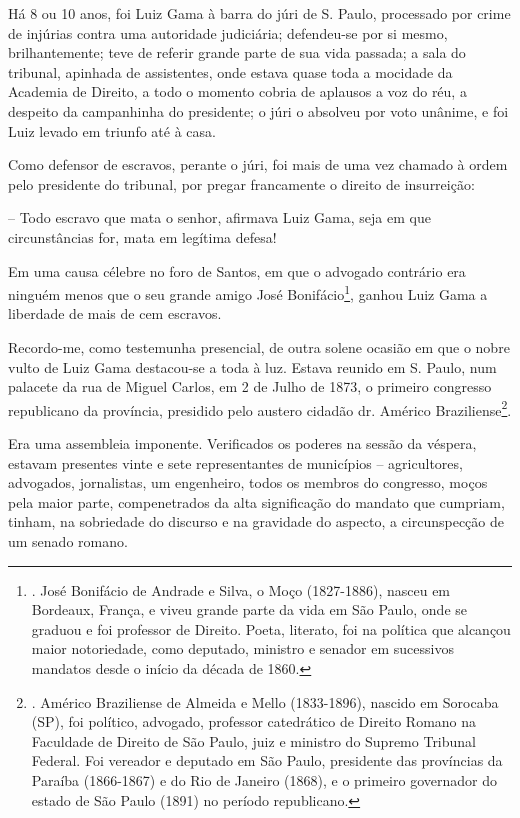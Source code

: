 Há 8 ou 10 anos, foi Luiz Gama à barra do júri de S. Paulo, processado
por crime de injúrias contra uma autoridade judiciária; defendeu-se por
si mesmo, brilhantemente; teve de referir grande parte de sua vida
passada; a sala do tribunal, apinhada de assistentes, onde estava quase
toda a mocidade da Academia de Direito, a todo o momento cobria de
aplausos a voz do réu, a despeito da campanhinha do presidente; o júri o
absolveu por voto unânime, e foi Luiz levado em triunfo até à casa.

Como defensor de escravos, perante o júri, foi mais de uma vez chamado à
ordem pelo presidente do tribunal, por pregar francamente o direito de
insurreição:

-- Todo escravo que mata o senhor, afirmava Luiz Gama, seja em que
circunstâncias for, mata em legítima defesa!

Em uma causa célebre no foro de Santos, em que o advogado contrário era
ninguém menos que o seu grande amigo José Bonifácio\footnote{. José
  Bonifácio de Andrade e Silva, o Moço (1827-1886), nasceu em Bordeaux,
  França, e viveu grande parte da vida em São Paulo, onde se graduou e
  foi professor de Direito. Poeta, literato, foi na política que
  alcançou maior notoriedade, como deputado, ministro e senador em
  sucessivos mandatos desde o início da década de 1860.}, ganhou Luiz
Gama a liberdade de mais de cem escravos.

Recordo-me, como testemunha presencial, de outra solene ocasião em que o
nobre vulto de Luiz Gama destacou-se a toda à luz. Estava reunido em S.
Paulo, num palacete da rua de Miguel Carlos, em 2 de Julho de 1873, o
primeiro congresso republicano da província, presidido pelo austero
cidadão dr. Américo Braziliense\footnote{. Américo Braziliense de
  Almeida e Mello (1833-1896), nascido em Sorocaba (SP), foi político,
  advogado, professor catedrático de Direito Romano na Faculdade de
  Direito de São Paulo, juiz e ministro do Supremo Tribunal Federal. Foi
  vereador e deputado em São Paulo, presidente das províncias da Paraíba
  (1866-1867) e do Rio de Janeiro (1868), e o primeiro governador do
  estado de São Paulo (1891) no período republicano.}.

Era uma assembleia imponente. Verificados os poderes na sessão da
véspera, estavam presentes vinte e sete representantes de municípios --
agricultores, advogados, jornalistas, um engenheiro, todos os membros do
congresso, moços pela maior parte, compenetrados da alta significação do
mandato que cumpriam, tinham, na sobriedade do discurso e na gravidade
do aspecto, a circunspecção de um senado romano.

